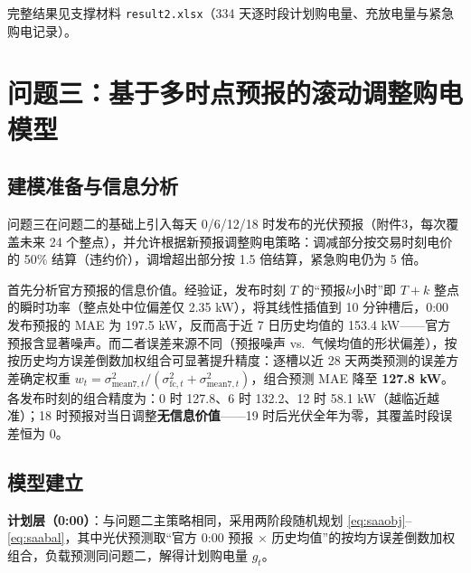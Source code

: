 \documentclass[zihao=-4,a4paper,UTF8,fontset=none]{ctexart}
\begin{document}
完整结果见支撑材料 \texttt{result2.xlsx}（334 天逐时段计划购电量、充放电量与紧急购电记录）。

\section{问题三：基于多时点预报的滚动调整购电模型}

\subsection{建模准备与信息分析}

问题三在问题二的基础上引入每天 0/6/12/18 时发布的光伏预报（附件3，每次覆盖未来 24 个整点），并允许根据新预报调整购电策略：调减部分按交易时刻电价的 50\% 结算（违约价），调增超出部分按 1.5 倍结算，紧急购电仍为 5 倍。

首先分析官方预报的信息价值。经验证，发布时刻 $T$ 的``预报$k$小时''即 $T{+}k$ 整点的瞬时功率（整点处中位偏差仅 2.35 kW），将其线性插值到 10 分钟槽后，0:00 发布预报的 MAE 为 197.5 kW，反而高于近 7 日历史均值的 153.4 kW——官方预报含显著噪声。而二者误差来源不同（预报噪声 vs.\ 气候均值的形状偏差），按按历史均方误差倒数加权组合可显著提升精度：逐槽以近 28 天两类预测的误差方差确定权重 $w_t = \sigma_{\mathrm{mean7},t}^2 / (\sigma_{\mathrm{fc},t}^2 + \sigma_{\mathrm{mean7},t}^2)$，组合预测 MAE 降至 \textbf{127.8 kW}。各发布时刻的组合精度为：0 时 127.8、6 时 132.2、12 时 58.1 kW（越临近越准）；18 时预报对当日调整\textbf{无信息价值}——19 时后光伏全年为零，其覆盖时段误差恒为 0。

\subsection{模型建立}

\textbf{计划层（0:00）}：与问题二主策略相同，采用两阶段随机规划 \eqref{eq:saaobj}--\eqref{eq:saabal}，其中光伏预测取``官方 0:00 预报 × 历史均值''的按均方误差倒数加权组合，负载预测同问题二，解得计划购电量 $g_t$。
\end{document}

